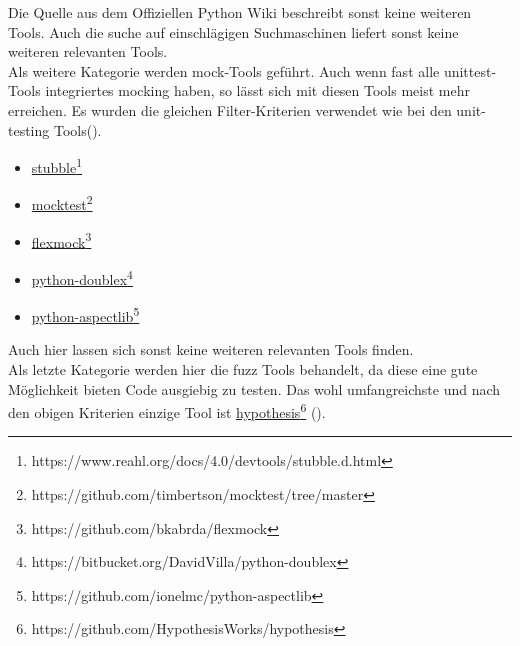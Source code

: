 Die Quelle aus dem Offiziellen Python Wiki beschreibt sonst keine weiteren
Tools. Auch die suche auf einschlägigen Suchmaschinen liefert sonst keine
weiteren relevanten Tools.
\newline
\\
Als weitere Kategorie werden \Gls{mock}-Tools geführt. Auch wenn fast alle
unittest-Tools integriertes \gls{mock}ing haben, so lässt sich mit diesen
Tools meist mehr erreichen. Es wurden die gleichen Filter-Kriterien verwendet
wie bei den unit-testing Tools(\cite{wiki.python:PythonTestingToolsTaxonomy}).
\begin{itemize}
    \item \href{https://www.reahl.org/docs/4.0/devtools/stubble.d.html}{stubble}\footnote{https://www.reahl.org/docs/4.0/devtools/stubble.d.html}
    \item \href{https://github.com/timbertson/mocktest/tree/master}{mocktest}\footnote{https://github.com/timbertson/mocktest/tree/master}
    \item \href{https://github.com/bkabrda/flexmock}{flexmock}\footnote{https://github.com/bkabrda/flexmock}
    \item \href{https://bitbucket.org/DavidVilla/python-doublex}{python-doublex}\footnote{https://bitbucket.org/DavidVilla/python-doublex}
    \item \href{https://github.com/ionelmc/python-aspectlib}{python-aspectlib}\footnote{https://github.com/ionelmc/python-aspectlib}
\end{itemize}
Auch hier lassen sich sonst keine weiteren relevanten Tools finden.
\newline
\\
Als letzte Kategorie werden hier die \Gls{fuzz} Tools behandelt, da diese eine
gute Möglichkeit bieten Code ausgiebig zu testen. Das wohl umfangreichste und nach den obigen Kriterien
einzige Tool ist \href{https://github.com/HypothesisWorks/hypothesis}{hypothesis}\footnote{https://github.com/HypothesisWorks/hypothesis} (\cite{wiki.python:PythonTestingToolsTaxonomy}).




